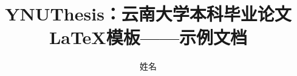 \documentclass[type=Bachelor, print=twoside]{style/YNU-thesis}
\title{YNUThesis：云南大学本科毕业论文\\ \LaTeX 模板——示例文档}
\author{姓名}
\begin{document}
	\makecover                             %

	\frontmatter                           %
	\tableofcontents                       %

    \mainmatter                     %


	
\end{document}
